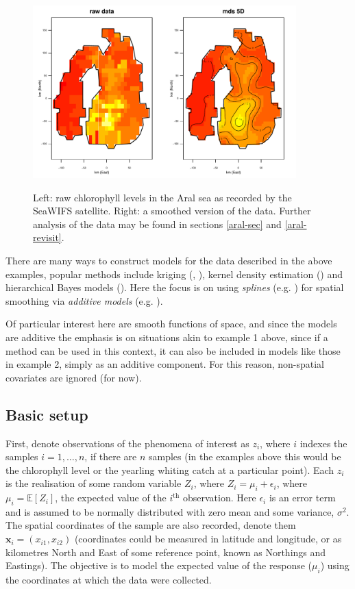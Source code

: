 \begin{figure}[tb]
\centering
\includegraphics[width=4in, trim=0in 0in 0in 0.3in, clip]{mds/figs/aral-5d-duchon.pdf}\\
\caption{Left: raw chlorophyll levels in the Aral sea as recorded by the SeaWIFS satellite. Right: a smoothed version of the data. Further analysis of the data may be found in sections \ref{aral-sec} and \ref{aral-revisit}.}
\label{aral-intro}
\end{figure}

There are many ways to construct models for the data described in the above examples, popular methods include kriging (\cite{diggle},  \cite{schabenberger}), kernel density estimation (\cite{wandKDE}) and hierarchical Bayes models (\cite{banerjee}). Here the focus is on using \textit{splines} (e.g. \cite{wahba}) for spatial smoothing via \textit{additive models} (e.g. \cite{gammonograph}).

Of particular interest here are smooth functions of space, and since the models are additive the emphasis is on situations akin to example 1 above, since if a method can be used in this context, it can also be included in models like those in example 2, simply as an additive component. For this reason, non-spatial covariates are ignored (for now).

\subsection{Basic setup}
\label{intro-basic-setup}

First, denote observations of the phenomena of interest as $z_i$, where $i$ indexes the samples $i=1,\ldots,n$, if there are $n$ samples (in the examples above this would be the chlorophyll level or the yearling whiting catch at a particular point). Each  $z_i$ is the realisation of some random variable $Z_i$, where $Z_i=\mu_i+\epsilon_i$, where $\mu_i=\mathbb{E}[Z_i]$, the expected value of the $i^\text{th}$ observation. Here $\epsilon_i$ is an error term and is assumed to be normally distributed with zero mean and some variance, $\sigma^2$. The spatial coordinates of the sample are also recorded, denote them $\mathbf{x}_i = (x_{i1}, x_{i2})$ (coordinates could be measured in latitude and longitude, or as kilometres North and East of some reference point, known as Northings and Eastings). The objective is to model the expected value of the response ($\mu_i$) using the coordinates at which the data were collected.

